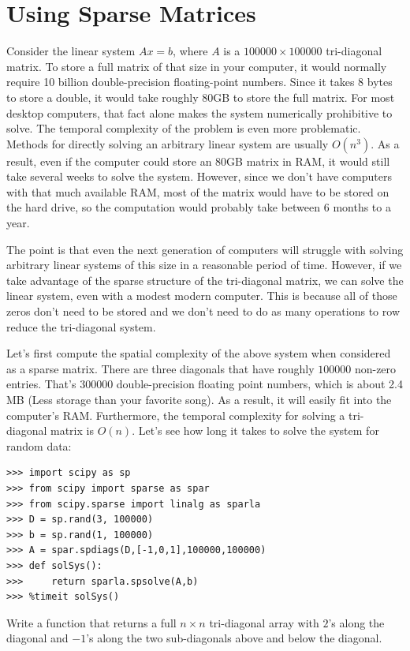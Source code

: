 \section*{Using Sparse Matrices}
Consider the linear system $A x = b$, where $A$ is a $100000\times 100000$ tri-diagonal matrix.
To store a full matrix of that size in your computer, it would normally require 10
billion double-precision floating-point numbers.  Since it takes 8
bytes to store a double, it would take roughly 80GB to store the
full matrix.  For most desktop computers, that fact alone makes the
system numerically prohibitive to solve.
The temporal complexity of the problem is even more problematic.
Methods for directly solving an arbitrary linear system are usually $O(n^3)$.
As a result, even if the computer could store an 80GB matrix in RAM, it
would still take several weeks to solve the system.  However, since
we don't have computers with that much available RAM, most of the
matrix would have to be stored on the hard drive, so the computation
would probably take between $6$ months to a year.

The point is that even the next generation of computers will
struggle with solving arbitrary linear systems of this size in a
reasonable period of time.  However, if we take advantage of the
sparse structure of the tri-diagonal matrix, we can solve the linear
system, even with a modest modern computer.  This is because all of
those zeros don't need to be stored and we don't need to do as many
operations to row reduce the tri-diagonal system.

Let's first compute the spatial complexity of the above system when
considered as a sparse matrix.  There are three diagonals that have
roughly $100000$ non-zero entries.  That's $300000$
double-precision floating point numbers, which is about 2.4 MB (Less
storage than your favorite song).  As a result, it will easily
fit into the computer's RAM.  Furthermore, the temporal complexity for solving
a tri-diagonal matrix is $O(n)$. Let's see how long it takes to
solve the system for random data:
\begin{lstlisting}
>>> import scipy as sp
>>> from scipy import sparse as spar
>>> from scipy.sparse import linalg as sparla
>>> D = sp.rand(3, 100000)
>>> b = sp.rand(1, 100000)
>>> A = spar.spdiags(D,[-1,0,1],100000,100000)
>>> def solSys():
>>>     return sparla.spsolve(A,b)
>>> %timeit solSys()
\end{lstlisting}

\begin{problem}
Write a function that returns a full $n\times n$
tri-diagonal array with $2$'s along the diagonal and $-1$'s along
the two sub-diagonals above and below the diagonal.
\label{prob:full_tridiag}
\end{problem}

